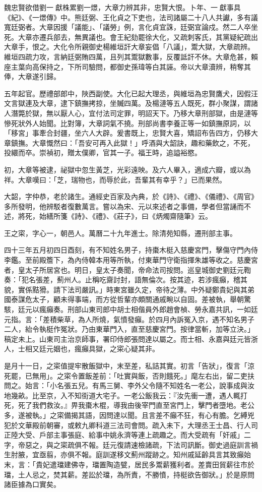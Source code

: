 \begin{pinyinscope}
魏忠賢欲借劉一獻株累劉一燝，大章力辨其非，忠賢大恨。卜年、一獻事具《紀》、《一燝傳》中。熊廷弼、王化貞之下吏也，法司諸屬二十八人共讞，多有議寬廷弼者。大章因援「議能」、「議勞」例，言化貞宜誅，廷弼宜論戍。然二人卒坐死。大章亦遷兵部去，無異議也。會王紀劾罷徐大化，又疏刺客氏，其黨疑紀疏出大章手，恨之。大化令所親御史楊維垣訐大章妄倡「八議」，鬻大獄，大章疏辨。維垣四疏力攻，言納廷弼賄四萬，且列其鬻獄數事，反覆詆訐不休。大章危甚，賴座主葉向高保持之，下所司驗問，都御史孫瑋等白其誣。帝以大章瀆辨，稍奪其俸，大章遂引歸。

五年起官。歷禮部郎中，陜西副使。大化已起大理丞，與維垣為忠賢鷹犬，因假汪文言獄連及大章，逮下鎮撫拷掠，坐贓四萬。及楊漣等五人既死，群小聚謀，謂諸人潛斃於獄，無以厭人心，宜付法司定罪，明詔天下。乃移大章刑部獄，由是漣等慘死狀外人始聞。比對簿，大章詞氣不撓。刑部尚書李養正等一如鎮撫原詞，以「移宮」事牽合封疆，坐六人大辟。爰書既上，忠賢大喜，矯詔布告四方，仍移大章鎮撫。大章慨然曰：「吾安可再入此獄！」呼酒與大韶訣，趣和藥飲之，不死，投繯而卒。崇禎初，贈太僕卿，官其一子。福王時，追謚裕愍。

初，大章等被逮，祕獄中忽生黃芝，光彩遠映。及六人畢入，適成六瓣，或以為祥。大章嘆曰：「芝，瑞物也，而辱於此，吾輩其有幸乎？」已而果然。

大韶，字仲恭，老於諸生。通經史百家及內典，於《詩》、《禮》、《儀禮》、《周官》多所發明，他辨駁者復數萬言。嘗以為宋、元以來述者之事備，學者但當誦而不述，將死，始繕所箋《詩》、《禮》、《莊子》，曰《炳燭齋隨筆》云。

王之寀，字心一，朝邑人。萬曆二十九年進士。除清苑知縣，遷刑部主事。

四十三年五月初四日酉刻，有不知姓名男子，持棗木梃入慈慶宮門，擊傷守門內侍李鑑。至前殿簷下，為內侍韓本用等所執，付東華門守衛指揮朱雄等收之。慈慶宮者，皇太子所居宮也。明日，皇太子奏聞，帝命法司按問。巡皇城御史劉廷元鞫奏：「犯名張差，薊州人。止稱吃齋討封，語無倫次。按其迹，若涉瘋癲，稽其貌，實係黠猾。請下法司嚴訊。」時東宮雖久定，帝待之薄。中外疑鄭貴妃與其弟國泰謀危太子，顧未得事端，而方從哲輩亦頗關通戚畹以自固。差被執，舉朝驚駭，廷元以瘋癲奏。刑部山東司郎中胡士相偕員外郎趙會楨、勞永嘉共訊，一如廷元指。言：「差積柴草，為人所燒，氣憤發癲。於四月內訴冤入京，遇不知名男子二人，紿令執梃作冤狀。乃由東華門入，直至慈慶宮門。按律當斬，加等立決。」稿定未上。山東司主治京師事，署印侍郎張問達以屬之。而士相、永嘉與廷元皆浙人，士相又廷元姻也，瘋癲具獄，之寀心疑其非。

是月十一日，之寀值提牢散飯獄中，末至差，私詰其實。初言「告狀」，復言「涼死罷，已無用」。之寀令置飯差前：「吐實與飯，否則餓死。」麾左右出，留二吏扶問之。始言：「小名張五兒。有馬三舅、李外父令隨不知姓名一老公，說事成與汝地幾畝。比至京，入不知街道大宅子。一老公飯我云：『汝先衝一遭，遇人輒打死，死了我們救汝。』畀我棗木棍，導我由後宰門直至宮門上，擊門者墮地。老公多，遂被執。」之寀備揭其語，因問達以聞。且言差不癲不狂，有心有膽。乞縛兇犯於文華殿前朝審，或敕九卿科道三法司會問。疏入未下，大理丞王士昌、行人司正陸大受、戶部主事張庭、給事中姚永濟等連上疏趣之。而大受疏有「奸戚」二字，帝惡之，與之寀疏俱不報。廷元復請速檢諸疏，下法司訊斷。御史過庭訓言禍生肘腋，宜亟翦，亦俱不報。庭訓遂移文薊州蹤跡之。知州戚延齡具言其致癲始末，言：「貴妃遣璫建佛寺，璫置陶造甓，居民多鬻薪獲利者。差賣田貿薪往市於璫，土人忌之，焚其薪。差訟於璫，為所責，不勝憤，持梃欲告御狀。」於是原問諸臣據為口實矣。


\end{pinyinscope}
